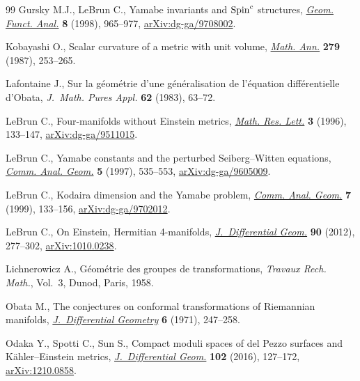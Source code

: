 \documentclass[10pt,a4paper]{amsart}
\numberwithin{equation}{section}
\begin{document}
\begin{thebibliography}{99}
Gursky M.J., LeBrun C., Yamabe invariants and {${\rm Spin}^c$} structures,
 \href{https://doi.org/10.1007/s000390050120}{\textit{Geom. Funct. Anal.}} \textbf{8} (1998), 965--977,
 \href{https://arxiv.org/abs/dg-ga/9708002}{arXiv:dg-ga/9708002}.

Kobayashi O., Scalar curvature of a metric with unit volume, \href{https://doi.org/10.1007/BF01461722}{\textit{Math.
 Ann.}} \textbf{279} (1987), 253--265.

Lafontaine J., Sur la g\'eom\'etrie d'une g\'en\'eralisation de l'\'equation
 diff\'erentielle d'{O}bata, \textit{J.~Math. Pures Appl.} \textbf{62} (1983),
 63--72.

LeBrun C., Four-manifolds without {E}instein metrics, \href{https://doi.org/10.4310/MRL.1996.v3.n2.a1}{\textit{Math. Res. Lett.}}
 \textbf{3} (1996), 133--147, \href{https://arxiv.org/abs/dg-ga/9511015}{arXiv:dg-ga/9511015}.

LeBrun C., Yamabe constants and the perturbed {S}eiberg--{W}itten equations,
 \href{https://doi.org/10.4310/CAG.1997.v5.n3.a6}{\textit{Comm. Anal. Geom.}} \textbf{5} (1997), 535--553,
 \href{https://arxiv.org/abs/dg-ga/9605009}{arXiv:dg-ga/9605009}.

LeBrun C., Kodaira dimension and the {Y}amabe problem, \href{https://doi.org/10.4310/CAG.1999.v7.n1.a5}{\textit{Comm. Anal.
 Geom.}} \textbf{7} (1999), 133--156, \href{https://arxiv.org/abs/dg-ga/9702012}{arXiv:dg-ga/9702012}.

LeBrun C., On {E}instein, {H}ermitian 4-manifolds, \href{https://doi.org/10.4310/jdg/1335230848}{\textit{J.~Differential
 Geom.}} \textbf{90} (2012), 277--302, \href{https://arxiv.org/abs/1010.0238}{arXiv:1010.0238}.

Lichnerowicz A., G\'eom\'etrie des groupes de transformations, \textit{Travaux
 Rech. Math.}, Vol.~3, Dunod, Paris, 1958.

Obata M., The conjectures on conformal transformations of {R}iemannian
 manifolds, \href{https://doi.org/10.4310/jdg/1214430407}{\textit{J.~Differential Geometry}} \textbf{6} (1971), 247--258.

Odaka Y., Spotti C., Sun S., Compact moduli spaces of del {P}ezzo surfaces and
 {K}\"ahler--{E}instein metrics, \href{https://doi.org/10.4310/jdg/1452002879}{\textit{J.~Differential Geom.}} \textbf{102}
 (2016), 127--172, \href{https://arxiv.org/abs/1210.0858}{arXiv:1210.0858}.


\end{thebibliography}
\end{document}
